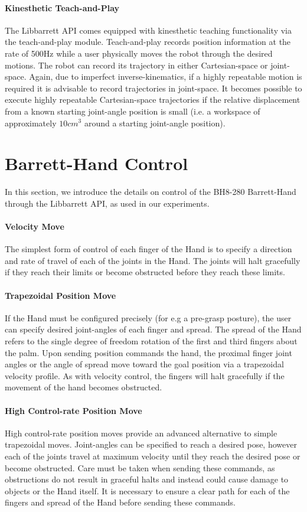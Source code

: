 \paragraph{Kinesthetic Teach-and-Play}
The Libbarrett API comes equipped with kinesthetic teaching functionality via the teach-and-play module.
Teach-and-play records position information at the rate of 500Hz while a user physically moves the robot through the desired motions.
The robot can record its trajectory in either Cartesian-space or joint-space.
Again, due to imperfect inverse-kinematics, if a highly repeatable motion is required it is advisable to record trajectories in joint-space.
It becomes possible to execute highly repeatable Cartesian-space trajectories if the relative displacement from a known starting joint-angle position is small (i.e. a workspace of approximately $10cm^3$ around a starting joint-angle position).

\section{Barrett-Hand Control}

In this section, we introduce the details on control of the BH8-280 Barrett-Hand through the Libbarrett API, as used in our experiments.

\paragraph{Velocity Move}
The simplest form of control of each finger of the Hand is to specify a direction and rate of travel of each of the joints in the Hand.
The joints will halt gracefully if they reach their limits or become obstructed before they reach these limits.

\paragraph{Trapezoidal Position Move}
If the Hand must be configured precisely (for e.g a pre-grasp posture), the user can specify desired joint-angles of each finger and spread.
The spread of the Hand refers to the single degree of freedom rotation of the first and third fingers about the palm.
Upon sending position commands the hand, the proximal finger joint angles or the angle of spread move toward the goal position via a trapezoidal velocity profile.
As with velocity control, the fingers will halt gracefully if the movement of the hand becomes obstructed.

\paragraph{High Control-rate Position Move}
High control-rate position moves provide an advanced alternative to simple trapezoidal moves.
Joint-angles can be specified to reach a desired pose, however each of the joints travel at maximum velocity until they reach the desired pose or become obstructed.
Care must be taken when sending these commands, as obstructions do not result in graceful halts and instead could cause damage to objects or the Hand itself.
It is necessary to ensure a clear path for each of the fingers and spread of the Hand before sending these commands.

